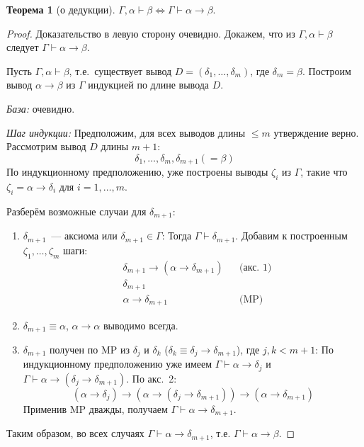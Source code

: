 \documentclass[a4paper,11pt]{article}
\theoremstyle{definition}
\newtheorem*{thm}{Теорема}
\newcommand{\proves}{\vdash}
\begin{document}
\begin{thm}[о дедукции]
$\Gamma, \alpha \proves \beta \Leftrightarrow \Gamma \proves \alpha \to \beta$.
\end{thm}
\begin{proof}
Доказательство в левую сторону очевидно. Докажем, что из $\Gamma, \alpha \proves
\beta$ следует $\Gamma \proves \alpha \to \beta$.

Пусть $\Gamma, \alpha \proves \beta$, т.е.\ существует вывод $D = (\delta_1,
\dots, \delta_m)$, где $\delta_m = \beta$. Построим вывод $\alpha \to \beta$ из
$\Gamma$ индукцией по длине вывода $D$.

\emph{База:} очевидно.

\emph{Шаг индукции:} Предположим, для всех выводов длины $\le m$ утверждение
верно. Рассмотрим вывод $D$ длины $m+1$:
\[ \delta_1, \dots, \delta_m, \delta_{m+1} (= \beta) \]
По индукционному предположению, уже построены выводы $\zeta_i$ из $\Gamma$, такие
что $\zeta_i = \alpha \to \delta_i$ для $i = 1, \dots, m$.

Разберём возможные случаи для $\delta_{m+1}$:
\begin{enumerate}
\item $\delta_{m+1}$~--- аксиома или $\delta_{m+1} \in \Gamma$: Тогда $\Gamma
  \proves \delta_{m+1}$. Добавим к построенным $\zeta_1, \dots, \zeta_m$ шаги:
  \begin{align*}
  &\delta_{m+1} \to (\alpha \to \delta_{m+1}) &&\text{(акс.\ 1)}\\
  &\delta_{m+1}\\
  &\alpha \to \delta_{m+1} &&\text{(MP)}
  \end{align*}
\item $\delta_{m+1} \equiv \alpha$, $\alpha \to \alpha$ выводимо всегда.
\item $\delta_{m+1}$ получен по MP из $\delta_j$ и $\delta_k$ ($\delta_k \equiv
  \delta_j \to \delta_{m+1}$), где $j, k < m+1$: По индукционному предположению
  уже имеем $\Gamma \proves \alpha \to \delta_j$ и $\Gamma \proves \alpha \to
  (\delta_j \to \delta_{m+1})$. По акс.\ 2:
  \[ (\alpha \to \delta_j) \to (\alpha \to (\delta_j \to \delta_{m+1})) \to (\alpha \to \delta_{m+1}) \]
  Применив MP дважды, получаем $\Gamma \proves \alpha \to \delta_{m+1}$.
\end{enumerate}
Таким образом, во всех случаях $\Gamma \proves \alpha \to \delta_{m+1}$, т.е.
$\Gamma \proves \alpha \to \beta$.
\end{proof}
\end{document}
